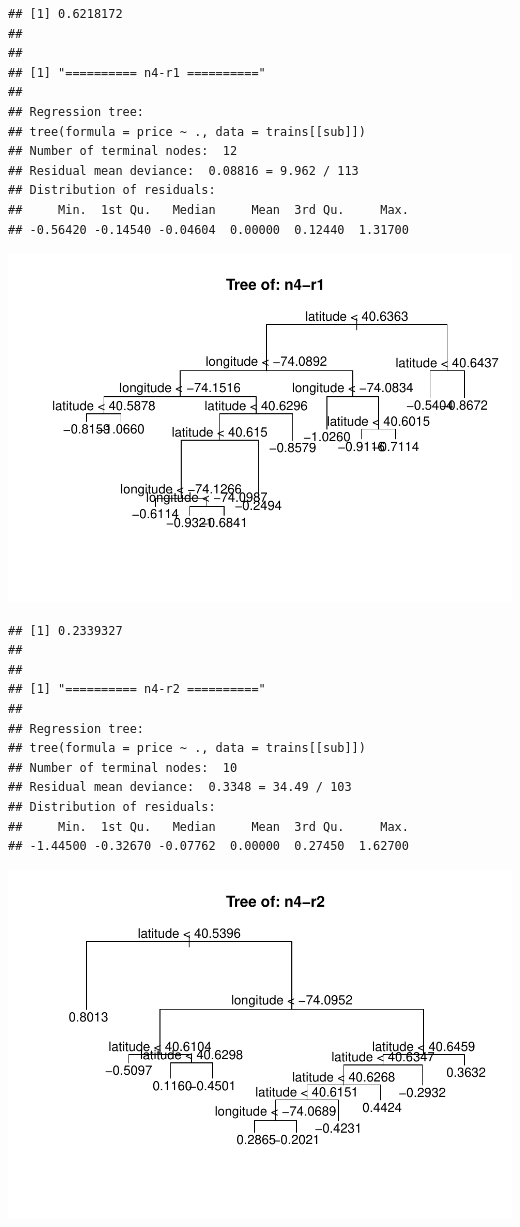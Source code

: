 \documentclass[
]{article}
\begin{document}
\begin{verbatim}
## [1] 0.6218172
## 
## 
## [1] "========== n4-r1 =========="
## 
## Regression tree:
## tree(formula = price ~ ., data = trains[[sub]])
## Number of terminal nodes:  12 
## Residual mean deviance:  0.08816 = 9.962 / 113 
## Distribution of residuals:
##     Min.  1st Qu.   Median     Mean  3rd Qu.     Max. 
## -0.56420 -0.14540 -0.04604  0.00000  0.12440  1.31700
\end{verbatim}

\includegraphics{project-code_files/figure-latex/unnamed-chunk-14-15.pdf}

\begin{verbatim}
## [1] 0.2339327
## 
## 
## [1] "========== n4-r2 =========="
## 
## Regression tree:
## tree(formula = price ~ ., data = trains[[sub]])
## Number of terminal nodes:  10 
## Residual mean deviance:  0.3348 = 34.49 / 103 
## Distribution of residuals:
##     Min.  1st Qu.   Median     Mean  3rd Qu.     Max. 
## -1.44500 -0.32670 -0.07762  0.00000  0.27450  1.62700
\end{verbatim}

\includegraphics{project-code_files/figure-latex/unnamed-chunk-14-16.pdf}
\end{document}
